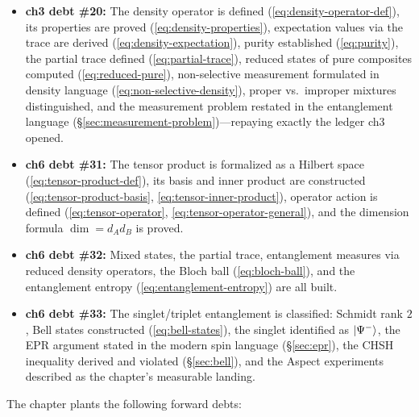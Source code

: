 \begin{itemize}
\item \textbf{ch3 debt \#20:} The density operator is defined (\eqref{eq:density-operator-def}), its properties are proved (\eqref{eq:density-properties}), expectation values via the trace are derived (\eqref{eq:density-expectation}), purity established (\eqref{eq:purity}), the partial trace defined (\eqref{eq:partial-trace}), reduced states of pure composites computed (\eqref{eq:reduced-pure}), non-selective measurement formulated in density language (\eqref{eq:non-selective-density}), proper vs.\ improper mixtures distinguished, and the measurement problem restated in the entanglement language (\S\ref{sec:measurement-problem})---repaying exactly the ledger ch3 opened.

\item \textbf{ch6 debt \#31:} The tensor product is formalized as a Hilbert space (\eqref{eq:tensor-product-def}), its basis and inner product are constructed (\eqref{eq:tensor-product-basis}, \eqref{eq:tensor-inner-product}), operator action is defined (\eqref{eq:tensor-operator}, \eqref{eq:tensor-operator-general}), and the dimension formula $\dim = d_A d_B$ is proved.

\item \textbf{ch6 debt \#32:} Mixed states, the partial trace, entanglement measures via reduced density operators, the Bloch ball (\eqref{eq:bloch-ball}), and the entanglement entropy (\eqref{eq:entanglement-entropy}) are all built.

\item \textbf{ch6 debt \#33:} The singlet/triplet entanglement is classified: Schmidt rank $2$, Bell states constructed (\eqref{eq:bell-states}), the singlet identified as $\ket{\Psi^-}$, the EPR argument stated in the modern spin language (\S\ref{sec:epr}), the CHSH inequality derived and violated (\S\ref{sec:bell}), and the Aspect experiments described as the chapter's measurable landing.
\end{itemize}

The chapter plants the following forward debts:

